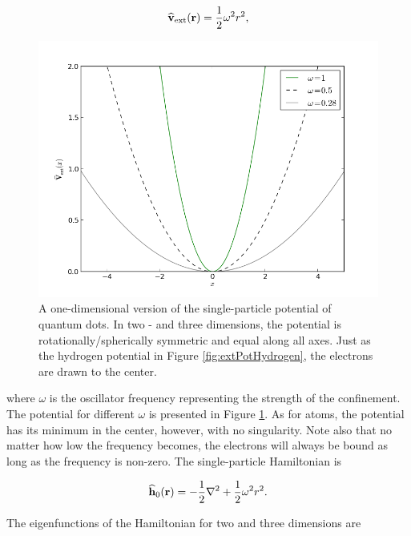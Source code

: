 \begin{equation}
 {\bf\widehat{v}}_\mathrm{ext}(\mathbf{r)} = \frac{1}{2}\omega^2r^2,
\end{equation}

\begin{figure}
 \begin{center}
  \includegraphics[scale=0.5]{../Graphics/Potentials/qdots.png}
  \caption{A one-dimensional version of the single-particle potential of quantum dots. In two - and three dimensions, the potential is rotationally/spherically symmetric and equal along all axes. Just as the hydrogen potential in Figure \ref{fig:extPotHydrogen}, the electrons are drawn to the center.}
  \label{fig:extPotQDOTS}
 \end{center}
\end{figure}

where $\omega$ is the oscillator frequency representing the strength of the confinement. The potential for different $\omega$ is presented in Figure \ref{fig:extPotQDOTS}. As for atoms, the potential has its minimum in the center, however, with no singularity. Note also that no matter how low the frequency becomes, the electrons will always be bound as long as the frequency is non-zero. The single-particle Hamiltonian is

\begin{equation}
 {\bf\widehat{h}}_0(\mathbf{r}) = -\frac{1}{2}\nabla^2 + \frac{1}{2}\omega^2r^2.
\end{equation}

The eigenfunctions of the Hamiltonian for two and three dimensions are \cite{Sakurai:94}

